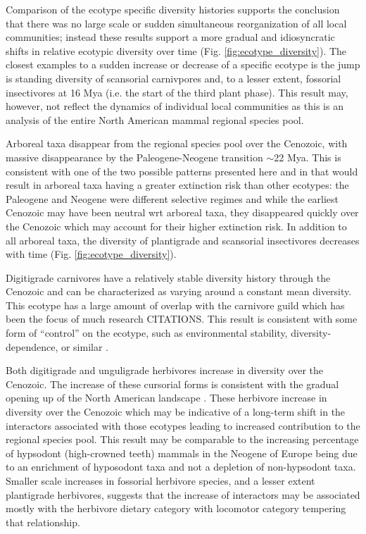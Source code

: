 \documentclass[12pt,letterpaper]{article}
\begin{document}
Comparison of the ecotype specific diversity histories supports the conclusion that there was no large scale or sudden simultaneous reorganization of all local communities; instead these results support a more gradual and idiosyncratic shifts in relative ecotypic diversity over time (Fig. \ref{fig:ecotype_diversity}). The closest examples to a sudden increase or decrease of a specific ecotype is the jump is standing diversity of scansorial carnivpores and, to a lesser extent, fossorial insectivores at 16 Mya (i.e. the start of the third plant phase). This result may, however, not reflect the dynamics of individual local communities as this is an analysis of the entire North American mammal regional species pool.

Arboreal taxa disappear from the regional species pool over the Cenozoic, with massive disappearance by the Paleogene-Neogene transition \(\sim\)22 Mya. This is consistent with one of the two possible patterns presented here and in \citet{Smits2015b} that would result in arboreal taxa having a greater extinction risk than other ecotypes: the Paleogene and Neogene were different selective regimes and while the earliest Cenozoic may have been neutral wrt arboreal taxa, they disappeared quickly over the Cenozoic which may account for their higher extinction risk. In addition to all arboreal taxa, the diversity of plantigrade and scansorial insectivores decreases with time (Fig. \ref{fig:ecotype_diversity}).

Digitigrade carnivores have a relatively stable diversity history through the Cenozoic and can be characterized as varying around a constant mean diversity. This ecotype has a large amount of overlap with the carnivore guild which has been the focus of much research CITATIONS. This result is consistent with some form of ``control'' on the ecotype, such as environmental stability, diversity-dependence, or similar \citet{Slater2015c,Silvestro2015b}.

Both digitigrade and unguligrade herbivores increase in diversity over the Cenozoic. The increase of these cursorial forms is consistent with the gradual opening up of the North American landscape \citep{Blois2009,Stromberg2005,Graham2011a}. These herbivore increase in diversity over the Cenozoic which may be indicative of a long-term shift in the interactors associated with those ecotypes leading to increased contribution to the regional species pool. This result may be comparable to the increasing percentage of hypsodont (high-crowned teeth) mammals in the Neogene of Europe being due to an enrichment of hyposodont taxa and not a depletion of non-hypsodont taxa. Smaller scale increases in fossorial herbivore species, and a lesser extent plantigrade herbivores, suggests that the increase of interactors may be associated mostly with the herbivore dietary category with locomotor category tempering that relationship.
\end{document}
